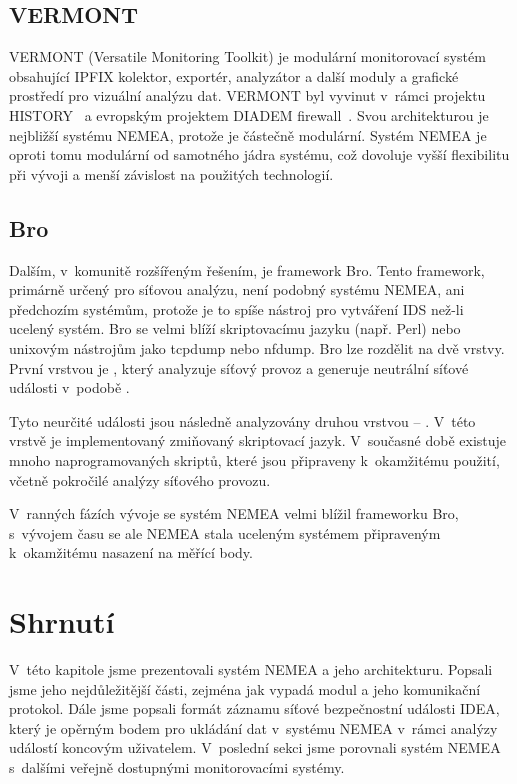 \subsection*{VERMONT}

VERMONT (Versatile Monitoring Toolkit) je modulární monitorovací systém obsahující IPFIX kolektor, exportér, analyzátor a další moduly a grafické prostředí pro vizuální analýzu dat. VERMONT byl vyvinut v~rámci projektu HISTORY~\cite{vermont:history} a evropským projektem DIADEM firewall~\cite{vermont:diadem}. Svou architekturou je nejbližší systému NEMEA, protože je částečně modulární. Systém NEMEA je oproti tomu modulární od samotného jádra systému, což dovoluje vyšší flexibilitu při vývoji a menší závislost na použitých technologií.

\subsection*{Bro}
Dalším, v~komunitě rozšířeným řešením, je framework Bro. Tento framework, primárně určený pro síťovou analýzu, není podobný systému NEMEA, ani předchozím systémům, protože je to spíše nástroj pro vytváření IDS než-li ucelený systém. Bro se velmi blíží skriptovacímu jazyku (např. Perl) nebo unixovým nástrojům jako tcpdump nebo nfdump. Bro lze rozdělit na dvě vrstvy. První vrstvou je , který analyzuje síťový provoz a generuje neutrální síťové události v~podobě . 

Tyto neurčité události jsou následně analyzovány druhou vrstvou -- . V~této vrstvě je implementovaný zmiňovaný skriptovací jazyk. V~současné době existuje mnoho naprogramovaných skriptů, které jsou připraveny k~okamžitému použití, včetně pokročilé analýzy síťového provozu.

V~ranných fázích vývoje se systém NEMEA velmi blížil frameworku Bro, s~vývojem času se ale NEMEA stala uceleným systémem připraveným k~okamžitému nasazení na měřící body.

\section{Shrnutí}

V~této kapitole jsme prezentovali systém NEMEA a jeho architekturu. Popsali jsme jeho nejdůležitější části, zejména jak vypadá modul a jeho komunikační protokol. Dále jsme popsali formát záznamu síťové bezpečnostní události IDEA, který je opěrným bodem pro ukládání dat v~systému NEMEA v~rámci analýzy událostí koncovým uživatelem. V~poslední sekci jsme porovnali systém NEMEA s~dalšími veřejně dostupnými monitorovacími systémy.

